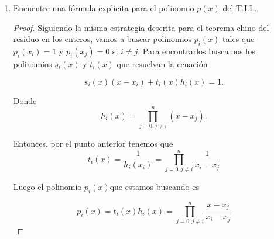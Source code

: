 \documentclass[letter,twoside,12pt]{article}
\begin{document}
\begin{enumerate}[label=\textbf{(\alph*)}]
\begin{proof}
Con $ q(x) $ y $ r(x) $ \'unicos y deg$(r(x))<$deg$(x-x_0)=1$. Por lo tanto $r(x)$ solo puede ser una constante. Adem\'as $r$ denotada de esta manera porque es una constante no puede ser igual a la constante 0, pues esto implicaria que $h_0(x)$ ser\'ia divisible por $x-x_0$, es decir que al evaluar en $x_0$, tendriamos que $h_0(x_0)=0$ que contradice nuestra suposici\'on.

Pero aun m\'as, si reducimos m\'odulo $\langle x - x_0 \rangle$ tenemos que $h_0 \equiv r $ mod $\langle x - x_0 \rangle$. Por el punto tenemoes que esto es equivalente a que $r=h_0(x_0)$.

Finalmente dividimos la ecuaci\'on (1) a lado y lado por $h_0(x_0)$ y obtenemos

\begin{equation}
\frac{h_0(x)}{h_0(x_0)}=\frac{q(x)}{h_0(x_0)}(x-x_0)+1 \nonumber
\end{equation}
y despejando el 1 obtenemos
\begin{equation}
-\frac{q(x)}{h_0(x_0)}(x-x_0)+\frac{h_0(x)}{h_0(x_0)}=+1 \nonumber
\end{equation}

Luego $s_0(x) = -q(x)/h_0(x_0)$ y $t_0(x)=1/h_0(x_0)$.
\end{proof}
\item Encuentre una f\'ormula explicita para el polinomio $p(x)$ del T.I.L.
\begin{proof}

Siguiendo la misma estrategia descrita para el teorema chino del residuo en los enteros, vamos a buscar polinomios $p_i(x)$ tales que $p_i(x_i)=1$ y $p_i(x_j)=0$ si $i\not = j$.
Para encontrarlos buscamos los polinomios $s_i(x)$ y $t_i(x)$ que resuelvan la ecuaci\'on

\begin{equation}
s_i(x)(x-x_i)+t_i(x)h_i(x)=1. \nonumber
\end{equation}

Donde 
\begin{equation}
h_i(x)=\prod_{j=0,j\not=i}^{n} (x-x_j). \nonumber
\end{equation}

Entonces, por el punto anterior tenemos que 
\begin{equation}
t_i(x)=\frac{1}{h_i(x_i)}=\prod_{j=0,j\not=i}^{n} \frac{1}{x_i-x_j} \nonumber
\end{equation}

Luego el polinomio $p_i(x)$que estamos buscando es

\begin{equation}
p_i(x)=t_i(x)h_i(x)=\prod_{j=0,j\not=i}^{n} \frac{x-x_j}{x_i-x_j} \nonumber
\end{equation}


\end{proof}
\end{enumerate}
\end{document}

